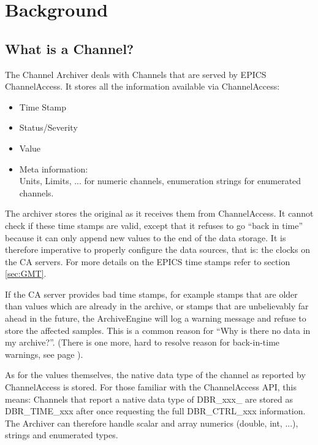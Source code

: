 \chapter{Background}

\section{What is a Channel?} %
The Channel Archiver deals with Channels that are served by EPICS
ChannelAccess. It stores all the information available via ChannelAccess:
\begin{itemize}
\item Time Stamp
\item Status/Severity
\item Value
\item Meta information:\\
      Units, Limits, ... for numeric channels,
      enumeration strings for enumerated channels.
\end{itemize}

\noindent The archiver stores the original  as it receives
them from ChannelAccess. It cannot check if these time stamps are valid, except
that it refuses to go ``back in time'' because it can only append new
values to the end of the data storage. It is therefore imperative to
properly configure the data sources, that is: the clocks on the CA
servers. For more details on the EPICS time stamps refer to section
\ref{sec:GMT}.

\label{back:in:time}
\NOTE If the CA server provides bad time stamps, for example stamps
that are older than values which are already in the archive, or stamps
that are unbelievably far ahead in the future, the ArchiveEngine will log
a warning message and refuse to store the affected samples.
This is a common reason for ``Why is there no data in my archive?''.
(There is one more, hard to resolve reason for back-in-time warnings, see
page \pageref{sec:back-in-timefaq}).

As for the values themselves, the native data type of the channel as
reported by ChannelAccess is stored. For those familiar with the
ChannelAccess API, this means:
Channels that report a native data type of DBR\_xxx\_ are stored as
DBR\_TIME\_xxx after once requesting the full DBR\_CTRL\_xxx information.
 The Archiver can therefore handle scalar and array numerics
(double, int, ...), strings and enumerated types. 

